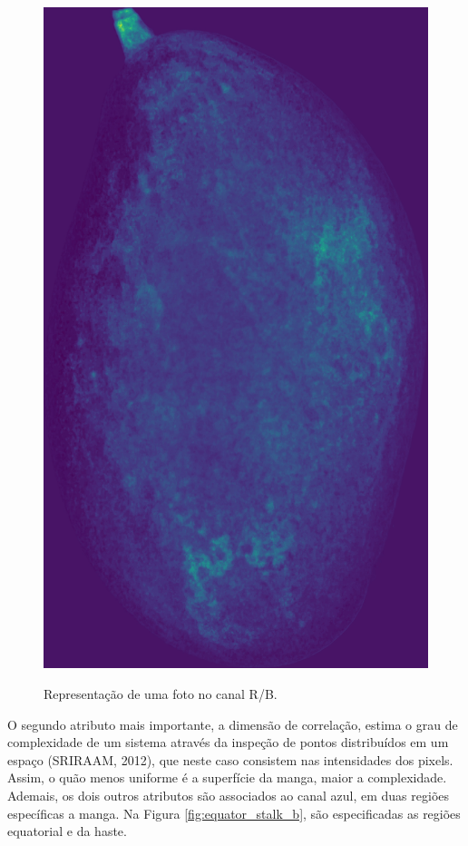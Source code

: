 \begin{figure}[H]
\centering
	\caption{Representação de uma foto no canal R/B.}
	\includegraphics[scale=0.07]{img/RB_rate_img.jpg}
	\label{fig:rbrate_fig}
\end{figure}

O segundo atributo mais importante, a dimensão de correlação, estima o grau de complexidade de um sistema através da inspeção de pontos distribuídos em um espaço (SRIRAAM, 2012), que neste caso consistem nas intensidades dos pixels. Assim, o quão menos uniforme é a superfície da manga, maior a complexidade. Ademais, os dois outros atributos são associados ao canal azul, em duas regiões específicas a manga. Na Figura \ref{fig:equator_stalk_b}, são especificadas as regiões equatorial e da haste.

